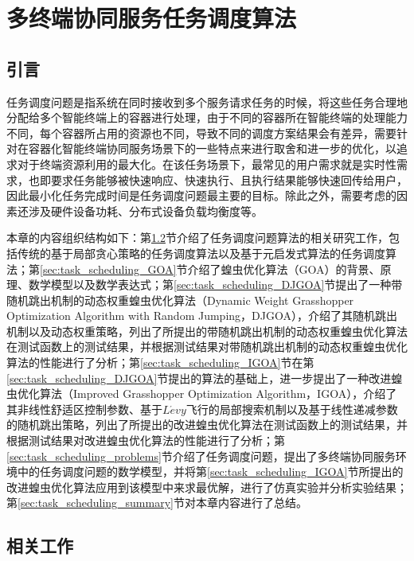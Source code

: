 \chapter{多终端协同服务任务调度算法}\label{chap:task_scheduling}

\section{引言}

任务调度问题是指系统在同时接收到多个服务请求任务的时候，将这些任务合理地分配给多个智能终端上的容器进行处理，由于不同的容器所在智能终端的处理能力不同，每个容器所占用的资源也不同，导致不同的调度方案结果会有差异，需要针对在容器化智能终端协同服务场景下的一些特点来进行取舍和进一步的优化，以追求对于终端资源利用的最大化。在该任务场景下，最常见的用户需求就是实时性需求，也即要求任务能够被快速响应、快速执行、且执行结果能够快速回传给用户，因此最小化任务完成时间是任务调度问题最主要的目标。除此之外，需要考虑的因素还涉及硬件设备功耗、分布式设备负载均衡度等。

本章的内容组织结构如下：第\ref{sec:task_scheduling_related_work}节介绍了任务调度问题算法的相关研究工作，包括传统的基于局部贪心策略的任务调度算法以及基于元启发式算法的任务调度算法；第\ref{sec:task_scheduling_GOA}节介绍了蝗虫优化算法（GOA）的背景、原理、数学模型以及数学表达式；第\ref{sec:task_scheduling_DJGOA}节提出了一种带随机跳出机制的动态权重蝗虫优化算法（Dynamic Weight Grasshopper Optimization Algorithm with Random Jumping，DJGOA），介绍了其随机跳出机制以及动态权重策略，列出了所提出的带随机跳出机制的动态权重蝗虫优化算法在测试函数上的测试结果，并根据测试结果对带随机跳出机制的动态权重蝗虫优化算法的性能进行了分析；第\ref{sec:task_scheduling_IGOA}节在第\ref{sec:task_scheduling_DJGOA}节提出的算法的基础上，进一步提出了一种改进蝗虫优化算法（Improved Grasshopper Optimization Algorithm，IGOA），介绍了其非线性舒适区控制参数、基于$L\acute{e}vy$飞行的局部搜索机制以及基于线性递减参数的随机跳出策略，列出了所提出的改进蝗虫优化算法在测试函数上的测试结果，并根据测试结果对改进蝗虫优化算法的性能进行了分析；第\ref{sec:task_scheduling_problems}节介绍了任务调度问题，提出了多终端协同服务环境中的任务调度问题的数学模型，并将第\ref{sec:task_scheduling_IGOA}节所提出的改进蝗虫优化算法应用到该模型中来求最优解，进行了仿真实验并分析实验结果；第\ref{sec:task_scheduling_summary}节对本章内容进行了总结。

\section{相关工作}\label{sec:task_scheduling_related_work}


